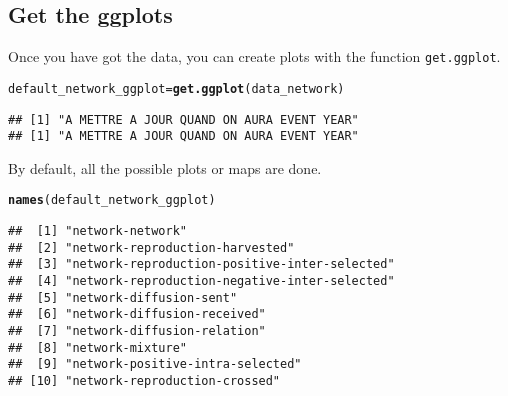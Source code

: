 \documentclass{article}\usepackage[]{graphicx}\usepackage[]{color}
\makeatletter
\newcommand{\hlstd}[1]{\textcolor[rgb]{0.345,0.345,0.345}{#1}}%
\newcommand{\hlkwb}[1]{\textcolor[rgb]{0.69,0.353,0.396}{#1}}%
\newcommand{\hlkwd}[1]{\textcolor[rgb]{0.737,0.353,0.396}{\textbf{#1}}}%
\newenvironment{kframe}{%
 \def\at@end@of@kframe{}%
 \ifinner\ifhmode%
  \def\at@end@of@kframe{\end{minipage}}%
  \begin{minipage}{\columnwidth}%
 \fi\fi%
 \def\FrameCommand##1{\hskip\@totalleftmargin \hskip-\fboxsep
 \colorbox{shadecolor}{##1}\hskip-\fboxsep
     \hskip-\linewidth \hskip-\@totalleftmargin \hskip\columnwidth}%
 \MakeFramed {\advance\hsize-\width
   \@totalleftmargin\z@ \linewidth\hsize
   \@setminipage}}%
 {\par\unskip\endMakeFramed%
 \at@end@of@kframe}
\newenvironment{knitrout}{}{} %
\makeatother
\begin{document}
\subsection{Get the ggplots}

Once you have got the data, you can create plots with the function \texttt{get.ggplot}.


\begin{knitrout}
\color{fgcolor}\begin{kframe}
\begin{alltt}
\hlstd{default_network_ggplot} \hlkwb{=} \hlkwd{get.ggplot}\hlstd{(data_network)}
\end{alltt}


{\ttfamily\noindent\itshape{}}\begin{verbatim}
## [1] "A METTRE A JOUR QUAND ON AURA EVENT YEAR"
## [1] "A METTRE A JOUR QUAND ON AURA EVENT YEAR"
\end{verbatim}
\end{kframe}
\end{knitrout}

By default, all the possible plots or maps are done.

\begin{knitrout}
\color{fgcolor}\begin{kframe}
\begin{alltt}
\hlkwd{names}\hlstd{(default_network_ggplot)}
\end{alltt}
\begin{verbatim}
##  [1] "network-network"                             
##  [2] "network-reproduction-harvested"              
##  [3] "network-reproduction-positive-inter-selected"
##  [4] "network-reproduction-negative-inter-selected"
##  [5] "network-diffusion-sent"                      
##  [6] "network-diffusion-received"                  
##  [7] "network-diffusion-relation"                  
##  [8] "network-mixture"                             
##  [9] "network-positive-intra-selected"             
## [10] "network-reproduction-crossed"
\end{verbatim}
\end{kframe}
\end{knitrout}
\end{document}
